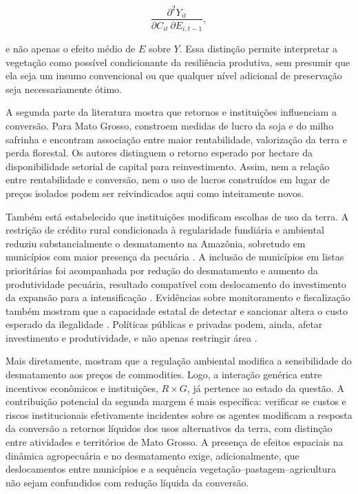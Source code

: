 \begin{equation}
    \frac{\partial^2 Y_{it}}
    {\partial C_{it}\,\partial E_{i,t-1}},
    \label{eq:cross_partial_h1}
\end{equation}

e não apenas o efeito médio de $E$ sobre $Y$. Essa distinção permite interpretar a vegetação como possível condicionante da resiliência produtiva, sem presumir que ela seja um insumo convencional ou que qualquer nível adicional de preservação seja necessariamente ótimo.

A segunda parte da literatura mostra que retornos e instituições influenciam a conversão. Para Mato Grosso, \cite{richards2026profits} constroem medidas de lucro da soja e do milho safrinha e encontram associação entre maior rentabilidade, valorização da terra e perda florestal. Os autores distinguem o retorno esperado por hectare da disponibilidade setorial de capital para reinvestimento. Assim, nem a relação entre rentabilidade e conversão, nem o uso de lucros construídos em lugar de preços isolados podem ser reivindicados aqui como inteiramente novos.

Também está estabelecido que instituições modificam escolhas de uso da terra. A restrição de crédito rural condicionada à regularidade fundiária e ambiental reduziu substancialmente o desmatamento na Amazônia, sobretudo em municípios com maior presença da pecuária \cite{assuncao2020credit}. A inclusão de municípios em listas prioritárias foi acompanhada por redução do desmatamento e aumento da produtividade pecuária, resultado compatível com deslocamento do investimento da expansão para a intensificação \cite{koch2019productivity}. Evidências sobre monitoramento e fiscalização também mostram que a capacidade estatal de detectar e sancionar altera o custo esperado da ilegalidade \cite{assuncao2023deter}. Políticas públicas e privadas podem, ainda, afetar investimento e produtividade, e não apenas restringir área \cite{moffette2021policies}.

Mais diretamente, \cite{harding2021commodity} mostram que a regulação ambiental modifica a sensibilidade do desmatamento aos preços de commodities. Logo, a interação genérica entre incentivos econômicos e instituições, $R\times G$, já pertence ao estado da questão. A contribuição potencial da segunda margem é mais específica: verificar se custos e riscos institucionais efetivamente incidentes sobre os agentes modificam a resposta da conversão a retornos líquidos dos usos alternativos da terra, com distinção entre atividades e territórios de Mato Grosso. A presença de efeitos espaciais na dinâmica agropecuária e no desmatamento \cite{kuschnig2021spillovers} exige, adicionalmente, que deslocamentos entre municípios e a sequência vegetação--pastagem--agricultura não sejam confundidos com redução líquida da conversão.

